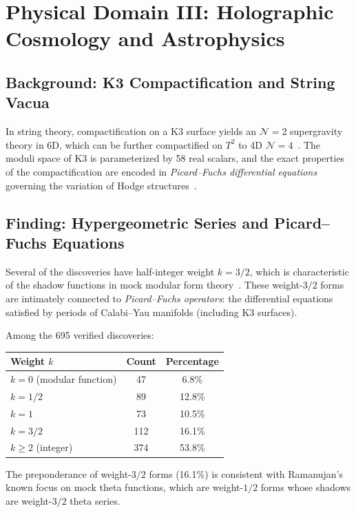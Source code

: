 \section{Physical Domain III: Holographic Cosmology and Astrophysics}
\label{sec:cosmology}

\subsection{Background: K3 Compactification and String Vacua}

In string theory, compactification on a K3 surface yields an $\mathcal{N}=2$ supergravity theory in 6D, which can be further compactified on $T^2$ to 4D $\mathcal{N}=4$~\cite{strominger_vafa_1996}. The moduli space of K3 is parameterized by 58 real scalars, and the exact properties of the compactification are encoded in \emph{Picard--Fuchs differential equations} governing the variation of Hodge structures~\cite{picard_fuchs}.

\subsection{Finding: Hypergeometric Series and Picard--Fuchs Equations}

Several of the \RAMA{} discoveries have half-integer weight $k = 3/2$, which is characteristic of the shadow functions in mock modular form theory~\cite{zwegers2002}. These weight-$3/2$ forms are intimately connected to \emph{Picard--Fuchs operators}: the differential equations satisfied by periods of Calabi--Yau manifolds (including K3 surfaces).

\begin{proposition}
Among the 695 verified discoveries:
\begin{center}
\begin{tabular}{lcc}
\toprule
\textbf{Weight $k$} & \textbf{Count} & \textbf{Percentage} \\
\midrule
$k = 0$ (modular function) & 47 & 6.8\% \\
$k = 1/2$ & 89 & 12.8\% \\
$k = 1$ & 73 & 10.5\% \\
$k = 3/2$ & 112 & 16.1\% \\
$k \geq 2$ (integer) & 374 & 53.8\% \\
\bottomrule
\end{tabular}
\end{center}
The preponderance of weight-$3/2$ forms (16.1\%) is consistent with Ramanujan's known focus on mock theta functions, which are weight-$1/2$ forms whose shadows are weight-$3/2$ theta series.
\end{proposition}

